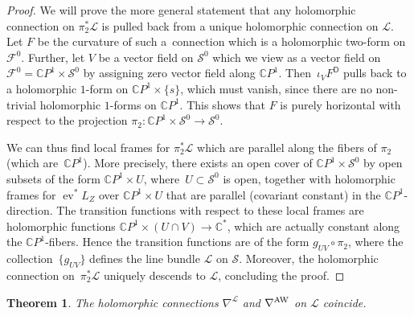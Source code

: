 \documentclass[pdftex]{sigma}
\numberwithin{equation}{section}
\newtheorem{Theorem}{Theorem}[section]
\theoremstyle{definition}
\newcommand\C{{\mathbb C}}
\begin{document}
\begin{proof}
We will prove the more general statement that any holomorphic connection on $\pi_2^*\mathcal L$
is pulled back from a unique holomorphic connection on $\mathcal L$. Let $F$ be the curvature
of such a~connection which is a holomorphic two-form on $\mathcal{F}^0$. Further, let $V$ be a
vector field on $\mathcal S^0$ which we view as a vector field on $\mathcal F^0 = \C P^1\times
\mathcal S^0$ by assigning zero vector field along $\C P^1$.
Then~$\iota_VF^\mathsf{D}$ pulls back to a holomorphic $1$-form on $\C
P^1\times\{s\}$, which must vanish, since there are no non-trivial holomorphic $1$-forms on $\C
P^1$. This shows that $F$ is purely horizontal with respect to the projection $\pi_2\colon \C P^1\times
\mathcal S^0 \longrightarrow \mathcal S^0$.

We can thus find local frames for $\pi_2^*\mathcal L$ which are parallel along the fibers of
$\pi_2$ \big(which are~$\mathbb CP^1$\big). More precisely, there exists an open cover of $\C P^1\times
\mathcal S^0$ by open subsets of the form $\C P^1\times U$, where~${U \subset \mathcal S^0}$ is open,
together with holomorphic frames for $\operatorname{ev}^*L_Z$ over $\C P^1\times U$ that are parallel
(covariant constant) in the $\C P^1$-direction. The transition functions with respect to
these local frames are
holomorphic functions $\C P^1\times (U\cap V) \longrightarrow \C^*$, which are actually
constant along the $\C
P^1$-fibers. Hence the transition functions are of the form $g_{UV}\circ \pi_2$, where the
collection~$\{g_{UV}\}$ defines the line
bundle $\mathcal L$ on $\mathcal S$. Moreover, the holomorphic connection on~$\pi_2^*\mathcal L$ uniquely descends to $\mathcal L$, concluding the proof.
\end{proof}

\begin{Theorem}\label{AWH}
The holomorphic connections $\nabla^{\mathcal{L}}$ and $\nabla^{\rm AW}$ on $\mathcal{L}$ coincide.
\end{Theorem}
\end{document}

